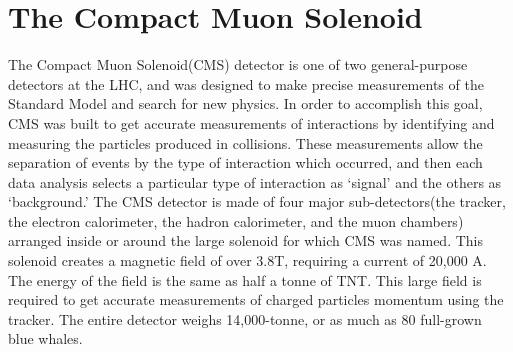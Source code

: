 \section{The Compact Muon Solenoid}
The Compact Muon Solenoid(CMS) detector is one of two general-purpose detectors at the LHC, and was designed to make precise measurements of the Standard Model and search for new physics. In order to accomplish this goal, CMS was built to get accurate measurements of interactions by identifying and measuring the particles produced in collisions. These measurements allow the separation of events by the type of interaction which occurred, and then each data analysis selects a particular type of interaction as `signal' and the others as `background.'
The CMS detector is made of four major sub-detectors(the tracker, the electron calorimeter, the hadron calorimeter, and the muon chambers) arranged inside or around the large solenoid for which CMS was named. This solenoid creates a magnetic field of over 3.8T, requiring a current of 20,000 A. The energy of the field is the same as half a tonne of TNT. This large field is required to get accurate measurements of charged particles momentum  using the tracker. The entire detector weighs 14,000-tonne, or as much as 80 full-grown blue whales.

